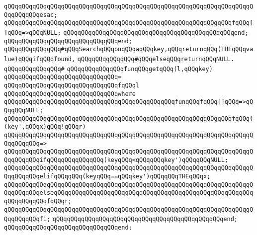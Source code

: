 \verb|qQQqqQQqqQQqqQQqqQQqqQQqqQQqqQQqqQQqqQQqqQQqqQQqqQQqqQQqqQQqqQQqqQQqqQQqqQQqqQQqesac;|\newline
\newline
\verb|qQQqqQQqqQQqqQQqqQQqqQQqqQQqqQQqqQQqqQQqqQQqqQQqqQQqqQQqqQQqqQQqfqQQq[]qQQq=>qQQqNULL;|\newline
\verb|qQQqqQQqqQQqqQQqqQQqqQQqqQQqqQQqqQQqqQQqqQQqqQQqend;|\newline
\verb|qQQqqQQqqQQqqQQqqQQqqQQqqQQqqQQqend;|\newline
\newline
\verb|qQQqqQQqqQQqqQQq#qQQqSearchqQQqonqQQqaqQQqkey,qQQqreturnqQQq(THEqQQqvalue)qQQqifqQQqfound,|\newline
\verb|qQQqqQQqqQQqqQQq#qQQqelseqQQqreturnqQQqNULL.|\newline
\verb|qQQqqQQqqQQqqQQq#|\newline
\verb|qQQqqQQqqQQqqQQqfunqQQqgetqQQq(l,qQQqkey)|\newline
\verb|qQQqqQQqqQQqqQQqqQQqqQQqqQQqqQQq=|\newline
\verb|qQQqqQQqqQQqqQQqqQQqqQQqqQQqqQQqfqQQql|\newline
\verb|qQQqqQQqqQQqqQQqqQQqqQQqqQQqqQQqwhere|\newline
\verb|qQQqqQQqqQQqqQQqqQQqqQQqqQQqqQQqqQQqqQQqqQQqqQQqfunqQQqfqQQq[]qQQq=>qQQqqQQqNULL;|\newline
\newline
\verb|qQQqqQQqqQQqqQQqqQQqqQQqqQQqqQQqqQQqqQQqqQQqqQQqqQQqqQQqqQQqqQQqfqQQq((key',qQQqx)qQQq!qQQqr)|\newline
\verb|qQQqqQQqqQQqqQQqqQQqqQQqqQQqqQQqqQQqqQQqqQQqqQQqqQQqqQQqqQQqqQQqqQQqqQQqqQQqqQQq=>|\newline
\verb|qQQqqQQqqQQqqQQqqQQqqQQqqQQqqQQqqQQqqQQqqQQqqQQqqQQqqQQqqQQqqQQqqQQqqQQqqQQqqQQqifqQQqqQQqqQQqqQQq(keyqQQq<qQQqqQQqkey')qQQqqQQqNULL;|\newline
\verb|qQQqqQQqqQQqqQQqqQQqqQQqqQQqqQQqqQQqqQQqqQQqqQQqqQQqqQQqqQQqqQQqqQQqqQQqqQQqqQQqelifqQQqqQQq(keyqQQq==qQQqkey')qQQqqQQqTHEqQQqx;|\newline
\verb|qQQqqQQqqQQqqQQqqQQqqQQqqQQqqQQqqQQqqQQqqQQqqQQqqQQqqQQqqQQqqQQqqQQqqQQqqQQqqQQqelseqQQqqQQqqQQqqQQqqQQqqQQqqQQqqQQqqQQqqQQqqQQqqQQqqQQqqQQqqQQqqQQqqQQqfqQQqr;|\newline
\verb|qQQqqQQqqQQqqQQqqQQqqQQqqQQqqQQqqQQqqQQqqQQqqQQqqQQqqQQqqQQqqQQqqQQqqQQqqQQqqQQqfi;|\newline
\verb|qQQqqQQqqQQqqQQqqQQqqQQqqQQqqQQqqQQqqQQqqQQqqQQqend;|\newline
\verb|qQQqqQQqqQQqqQQqqQQqqQQqqQQqqQQqend;|\newline
